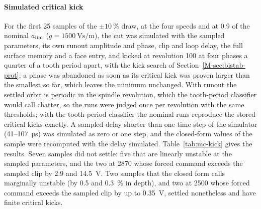\paragraph{Simulated critical kick} For the first 25 samples of the $\pm\SI{10}{\percent}$ draw, at the four speeds and at 0.9 of the nominal $a_{\lim}$ ($g=\SI{1500}{\volt\second\per\metre}$), the cut was simulated with the sampled parameters, its own runout amplitude and phase, clip and loop delay, the full surface memory and a face entry, and kicked at revolution 100 at four phases a quarter of a tooth period apart, with the kick search of Section~\ref{M-sec:bistab-prot}; a phase was abandoned as soon as its critical kick was proven larger than the smallest so far, which leaves the minimum unchanged. With runout the settled orbit is periodic in the spindle revolution, which the tooth-period classifier would call chatter, so the runs were judged once per revolution with the same thresholds; with the tooth-period classifier the nominal runs reproduce the stored critical kicks exactly. A sampled delay shorter than one time step of the simulator (41--\SI{107}{\micro\second}) was simulated as zero or one step, and the closed-form values of the sample were recomputed with the delay simulated. Table~\ref{tab:mc-kick} gives the results. Seven samples did not settle: five that are linearly unstable at the sampled parameters, and the two at \SI{2870}{\rpm} whose forced command exceeds the sampled clip by 2.9 and \SI{14.5}{\volt}. Two samples that the closed form calls marginally unstable (by 0.5 and \SI{0.3}{\percent} in depth), and two at \SI{2500}{\rpm} whose forced command exceeds the sampled clip by up to \SI{0.35}{\volt}, settled nonetheless and have finite critical kicks.

